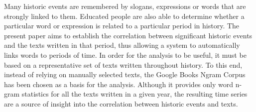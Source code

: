 Many historic events are remembered by slogans, expressions or words that are strongly linked to them. Educated people are also able to determine whether a particular word or expression is related to a particular period in history. The present paper aims to establish the correlation between significant historic events and the texts written in that period, thus allowing a system to automatically links words to periods of time. In order for the analysis to be useful, it must be based on a representative set of texts written throughout history. To this end, instead of relying on manually selected texts, the Google Books Ngram Corpus has been chosen as a basis for the analysis. Although it provides only word n-gram statistics for all the texts written in a given year, the resulting time series are a source of insight into the correlation between historic events and texts.
